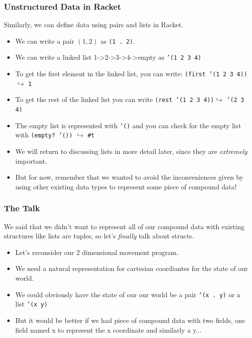 \documentclass{beamer}
\begin{document}
\begin{frame}
  \frametitle{Unstructured Data in Racket}
  Similarly, we can define data using pairs and lists in Racket.
  \begin{itemize}
  \item<2-> We can write a pair $(1, 2)$ as \texttt{(1 . 2)}.
  \item<3-> We can write a linked list 1->2->3->4->empty as \texttt{'(1 2 3 4)}
  \item<4-> To get the first element in the linked list, you can write:
    \texttt{(first '(1 2 3 4))}$\hookrightarrow$ \texttt{1}
  \item<5-> To get the rest of the linked list you can write
    \texttt{(rest '(1 2 3 4))}$\hookrightarrow$ \texttt{'(2 3 4)}
  \item<6-> The empty list is represented with \texttt{'()}
    and you can check for the empty list with \texttt{(empty? '())}
    $\hookrightarrow$ \texttt{\#t}
  \item<7-> We will return to discussing lists in more detail later,
    since they are \emph{extremely} important.
  \item<8-> But for now, remember that we wanted to avoid the inconveniences
    given by using other existing data types to represent some piece of compound data!
  \end{itemize}
\end{frame}

\begin{frame}
  \frametitle{The Talk}
  We said that we didn't want to represent all of our compound data with
  existing structures like lists are tuples, so
  let's \emph{finally} talk about structs.
  \begin{itemize}
  \item<2-> Let's reconsider our 2 dimensional movement program.
  \item<3-> We need a natural representation for cartesian coordiantes for the state of our world.
  \item<4-> We could obviously have the state of our our world be a pair
    \texttt{'(x . y)} or a list \texttt{'(x  y)}
  \item<5-> But it would be better if we had piece of compound data with two fields, one field named x to represent the x coordinate and similarly a y...
  \end{itemize}
\end{frame}
\end{document}
